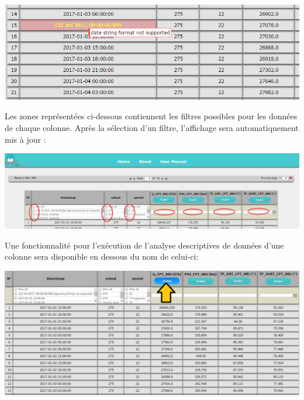		\begin{center}\includegraphics[scale=0.45]{fenetre2Erreur.png}\end{center}
		
		Les zones représentées ci-dessous contiennent les filtres possibles pour les données de chaque colonne. Après la sélection d'un filtre, l'affichage sera automatiquement mis à jour :\\
		
		\begin{center}\includegraphics[scale=0.45]{fenetre2Filtre.png}\end{center}
		
		Une fonctionnalité pour l'exécution de l'analyse descriptives de données d'une colonne sera disponible en dessous du nom de celui-ci:   \\
		
		\begin{center}\includegraphics[scale=0.45]{fenetre2Analyse.png}\end{center}
		
		
